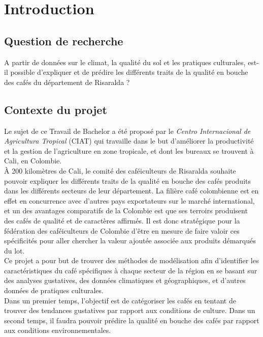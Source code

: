
\chapter{Introduction}
\section{Question de recherche}

A partir de données sur le climat, la qualité du sol et les pratiques culturales, est-il possible d’expliquer et de prédire les différents traits de la qualité en bouche des cafés du département de Risaralda ?


\section{Contexte du projet}
Le sujet de ce Travail de Bachelor a été proposé par le \textit{Centro Internacional de Agricultura Tropical } (CIAT) qui travaille dans le but d’améliorer la productivité et la gestion de l’agriculture en zone tropicale, et dont les bureaux se trouvent à Cali, en Colombie.\\

\noindent À 200 kilomètres de Cali, le comité des caféiculteurs de Risaralda souhaite pouvoir expliquer les différents traits de la qualité en bouche des cafés produits dans les différents secteurs de leur département. La filière café colombienne est en effet en concurrence avec d’autres pays exportateurs sur le marché international, et un des avantages comparatifs de la Colombie est que ses terroirs produisent des cafés de qualité et de caractères affirmés. Il est donc stratégique pour la fédération des caféiculteurs de Colombie d'être en mesure de faire valoir ces spécificités pour aller chercher la valeur ajoutée associée aux produits démarqués du lot.\\


\noindent Ce projet a pour but de trouver des méthodes de modélisation afin d’identifier les caractéristiques du café spécifiques à chaque secteur de la région en se basant sur des analyses gustatives, des données climatiques et géographiques, et d’autres données de pratiques culturales.\\


\noindent Dans un premier temps, l’objectif est de catégoriser les cafés en tentant de trouver des tendances gustatives par rapport aux conditions de culture. Dans un second temps, il faudra pouvoir prédire la qualité en bouche des cafés par rapport aux conditions environnementales.\\


